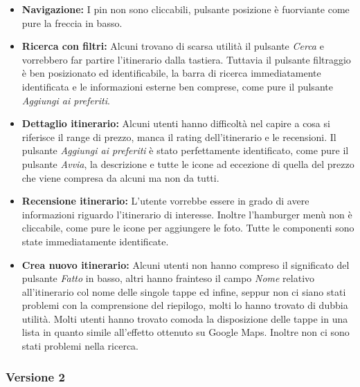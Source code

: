 \begin{itemize}

\item \textbf{Navigazione:} I pin non sono cliccabili, pulsante posizione è fuorviante come pure la freccia in basso.

\item \textbf{Ricerca con filtri:} Alcuni trovano di scarsa utilità il pulsante \emph{Cerca} e vorrebbero far partire l'itinerario dalla tastiera. Tuttavia il pulsante filtraggio è ben posizionato ed identificabile, la barra di ricerca immediatamente identificata e le informazioni esterne ben comprese, come pure il pulsante \emph{Aggiungi ai preferiti}.

\item \textbf{Dettaglio itinerario:} Alcuni utenti hanno difficoltà nel capire a cosa si riferisce il range di prezzo, manca il rating dell’itinerario e
le recensioni. Il pulsante \emph{Aggiungi ai preferiti} è stato perfettamente identificato, come pure il pulsante \emph{Avvia}, la descrizione e tutte le icone ad eccezione di quella del prezzo che viene compresa da alcuni ma non da tutti.

\item \textbf{Recensione itinerario:} L'utente vorrebbe essere in grado di avere informazioni riguardo l'itinerario di interesse. Inoltre l'hamburger menù non è cliccabile, come pure le icone per aggiungere le foto. Tutte le componenti sono state immediatamente identificate.

\item \textbf{Crea nuovo itinerario:} Alcuni utenti non hanno compreso il significato del pulsante \emph{Fatto} in basso, altri hanno frainteso il campo \emph{Nome} relativo all'itinerario col nome delle singole tappe ed infine, seppur non ci siano stati problemi con la comprensione del riepilogo, molti lo hanno trovato di dubbia utilità. Molti utenti hanno trovato comoda la disposizione delle tappe in una lista in quanto simile all'effetto ottenuto su Google Maps. Inoltre non ci sono stati problemi nella ricerca.

\end{itemize}

\subsubsection{Versione 2}

